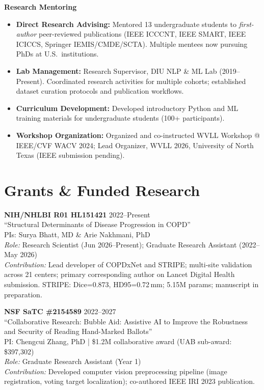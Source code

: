 \documentclass[11pt]{article}
\begin{document}
\textbf{Research Mentoring}
\begin{itemize}
  \item \textbf{Direct Research Advising:} Mentored 13 undergraduate students to \textit{first-author} peer-reviewed publications (IEEE ICCCNT, IEEE SMART, IEEE ICICCS, Springer IEMIS/CMDE/SCTA). Multiple mentees now pursuing PhDs at U.S.\ institutions.
  \item \textbf{Lab Management:} Research Supervisor, DIU NLP \& ML Lab (2019--Present). Coordinated research activities for multiple cohorts; established dataset curation protocols and publication workflows.
  \item \textbf{Curriculum Development:} Developed introductory Python and ML training materials for undergraduate students (100+ participants).
  \item \textbf{Workshop Organization:} Organized and co-instructed WVLL Workshop @ IEEE/CVF WACV 2024; Lead Organizer, WVLL 2026, University of North Texas (IEEE submission pending).
\end{itemize}

\section{Grants \& Funded Research}
\noindent\textbf{NIH/NHLBI R01 HL151421} \hfill 2022--Present\\
``Structural Determinants of Disease Progression in COPD''\\
PIs: Surya Bhatt, MD \& Arie Nakhmani, PhD\\
\textit{Role:} Research Scientist (Jun 2026--Present); Graduate Research Assistant (2022--May 2026)\\
\textit{Contribution:} Lead developer of COPDxNet and STRIPE; multi-site validation across 21 centers; primary corresponding author on Lancet Digital Health submission. STRIPE: Dice=0.873, HD95=0.72\,mm; 5.15M params; manuscript in preparation.

\vspace{6pt}
\noindent\textbf{NSF SaTC \#2154589} \hfill 2022--2027\\
``Collaborative Research: Bubble Aid: Assistive AI to Improve the Robustness and Security of Reading Hand-Marked Ballots''\\
PI: Chengcui Zhang, PhD | \$1.2M collaborative award (UAB sub-award: \$397,302)\\
\textit{Role:} Graduate Research Assistant (Year 1)\\
\textit{Contribution:} Developed computer vision preprocessing pipeline (image registration, voting target localization); co-authored IEEE IRI 2023 publication.
\end{document}
